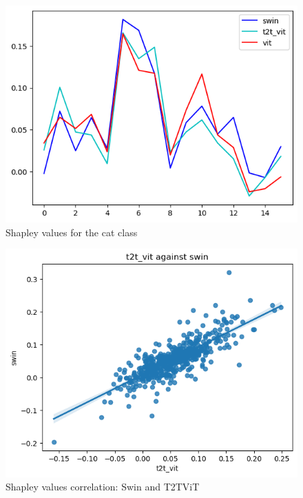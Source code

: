 \documentclass[magisterska,en]{pracamgr}
\begin{document}
\begin{figure}[H]
\centering
\includegraphics[scale=0.5]{./images/Cat_shapley.png}
\caption{Shapley values for the cat class}
\label{Cat_shapley}
\end{figure}




\begin{figure}[H]
\centering
\includegraphics[scale=0.5]{./images/shap_swin_t2t_vit.png}
\caption{Shapley values correlation: Swin and T2T\textunderscore ViT}
\label{shap_swin_t2t_vit}
\end{figure}
\end{document}
